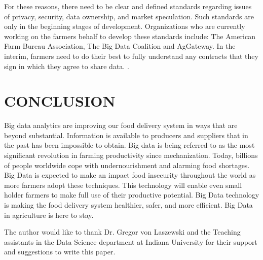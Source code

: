\documentclass[sigconf]{acmart}
\begin{document}
For these reasons, there need to be clear and defined standards regarding issues of privacy, security, data ownership, and market speculation. Such standards are only in the beginning stages of development. Organizations who are currently working on the farmers behalf to develop these standards include: The American Farm Bureau Association, The Big Data Coalition and AgGateway. In the interim, farmers need to do their best to fully understand any contracts that they sign in which they agree to share data.   \cite{Wolfert}.

\section{CONCLUSION}
Big data analytics are improving our food delivery system in ways that are beyond substantial.  Information is available to producers and suppliers that in the past has been impossible to obtain. Big data is being referred to as the most significant revolution in farming productivity since mechanization. Today, billions of people worldwide cope with undernourishment and alarming food shortages. Big Data is expected to make an impact food insecurity throughout the world as more farmers adopt these techniques. This technology will enable even small holder farmers to make full use of their productive potential.  Big Data technology is making the food delivery system healthier, safer, and more efficient.  Big Data in agriculture is here to stay.
\begin{acks}

  The author would like to thank Dr. Gregor von Laszewski and the Teaching assistants in the Data Science department at Indiana  University for their support and suggestions to write this paper.

\end{acks}




 
\end{document}
